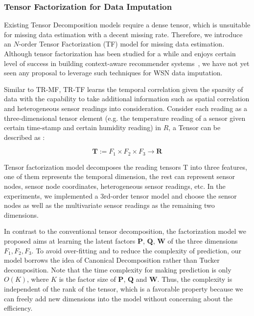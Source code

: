 \subsubsection{Tensor Factorization for Data Imputation} \label{sec:tfmissing}

Existing Tensor Decomposition models require a dense tensor, which is unsuitable for missing data estimation with a decent missing rate. 
Therefore, we introduce an $N$-order Tensor Factorization (TF) model for missing data estimation. Although tensor factorization has been studied for a while and enjoys certain level of success in building context-aware recommender systems~\cite{karatzoglou2010multiverse,rendle2010pairwise}, we have not yet seen any proposal to leverage such techniques for WSN data imputation.

Similar to TR-MF, TR-TF learns the temporal correlation given the sparsity of data with the capability to take additional information such as spatial correlation and heterogeneous sensor readings into consideration.
Consider each reading as a three-dimensional tensor element (e.g. the temperature reading of a sensor given certain time-stamp and certain humidity reading) in $R$, a Tensor can be described as :

\begin{equation*}
\mathbf{T} := F_1 \times  F_2 \times F_3 \rightarrow \mathbf{R} 
\end{equation*}

Tensor factorization model decomposes the reading tensors T into three features, one of them represents the temporal dimension, the rest can represent sensor nodes, sensor node coordinates, heterogeneous sensor readings, etc. In the experiments, we implemented a 3rd-order tensor model and choose the sensor nodes as well as the multivariate sensor readings as the remaining two dimensions.

In contrast to the conventional tensor decomposition, the factorization model we proposed aims at learning the latent factors $\mathbf{P}$,  $\mathbf{Q}$, $\mathbf{W}$ of the three dimensions $F_1, F_2, F_3$.
To avoid over-fitting and to reduce the complexity of prediction, our model borrows the idea of Canonical Decomposition rather than Tucker decomposition. Note that the time complexity for making prediction is only $O(K)$, where $K$ is the factor size of $\mathbf{P}$, $\mathbf{Q}$ and $\mathbf{W}$. Thus, the complexity is independent of the rank of the tensor, which is a favorable property because we can freely add new dimensions into the model without concerning about the efficiency.

